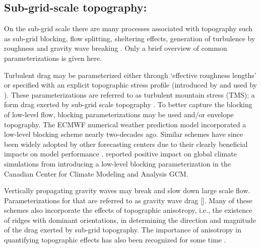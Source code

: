 \documentclass[gmd]{copernicus}
\begin{document}
\subsection{Sub-grid-scale topography: }
On the sub-grid scale there are many processes associated with topography such as sub-grid blocking, flow splitting, sheltering effects, generation of turbulence by roughness and gravity wave breaking \citep{B1990BAMS}. Only a brief overview of common parameterizations is given here.

Turbulent drag may be parameterized either through `effective roughness lengths' \citep{FP1972WJRMS} or  specified with an explicit topographic stress profile (introduced by \citet{WBH2001QJRMS} and used by \citet{BBW2004QJRMS}). These parameterizations are referred to as turbulent mountain stress (TMS); a form drag exerted by sub-grid scale topography \citep[][]{RSG2010JAS}. To better capture the blocking of low-level flow, blocking parameterizations may be used \citep{LM1997QJRMS} and/or envelope topography. The ECMWF numerical weather prediction model incorporated a low-level blocking scheme nearly two-decades ago.  Similar schemes have since been widely adopted by other forecasting centers due to their clearly beneficial impacts on model performance \citep[e.g.][]{WBCJ2003QJR,ZRLC2003AO,KD2005QJRMS}. \citet{SM2000QJRMS} reported positive impact on global climate simulations from introducing a low-level blocking parameterization in the Canadian Center for Climate Modeling and Analysis GCM.  

Vertically propagating gravity waves may break and slow down large scale flow. Parameterizations for that are referred to as gravity wave drag \citep[GWD; ][]{KEC2003AO} [{\color{red}{Julio: earlier reference?}}]. Many of these schemes also incorporate the effects of topographic anisotropy, i.e., the existence of ridges with dominant orientations, in determining  the direction and magnitude of the drag exerted by sub-grid topography.  The importance of anisotropy in quantifying topographic effects has also been recognized for some time \citep[e.g.,][]{BP1990ECMWF,B1993JAS}.

\end{document}
